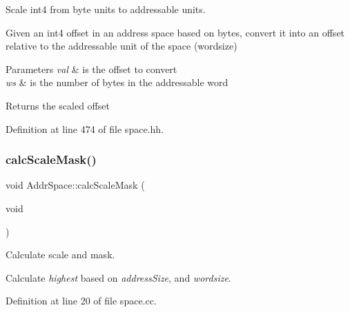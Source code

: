 Scale int4 from byte units to addressable units. 

Given an int4 offset in an address space based on bytes, convert it into an offset relative to the addressable unit of the space (wordsize) 
\begin{DoxyParams}{Parameters}
{\em val} & is the offset to convert \\
\hline
{\em ws} & is the number of bytes in the addressable word \\
\hline
\end{DoxyParams}
\begin{DoxyReturn}{Returns}
the scaled offset 
\end{DoxyReturn}


Definition at line 474 of file space.\+hh.

\mbox{\label{class_addr_space_af61640170c0baa861bbacee0e5c22a31}} 
\subsubsection{\texorpdfstring{calcScaleMask()}{calcScaleMask()}}
{\footnotesize\ttfamily void Addr\+Space\+::calc\+Scale\+Mask (\begin{DoxyParamCaption}\item[{void}]{ }\end{DoxyParamCaption})\hspace{0.3cm}{\ttfamily [protected]}}



Calculate scale and mask. 

Calculate {\itshape highest} based on {\itshape address\+Size}, and {\itshape wordsize}. 

Definition at line 20 of file space.\+cc.


